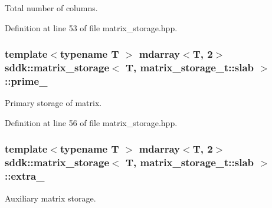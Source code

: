 Total number of columns. 



Definition at line 53 of file matrix\+\_\+storage.\+hpp.

\hypertarget{classsddk_1_1matrix__storage_3_01_t_00_01matrix__storage__t_1_1slab_01_4_a36fd50a540cca9842230ae29ba05b8bc}{}
\subsubsection[{prime\+\_\+}]{\setlength{\rightskip}{0pt plus 5cm}template$<$typename T $>$ {\bf mdarray}$<$T, 2$>$ {\bf sddk\+::matrix\+\_\+storage}$<$ T, matrix\+\_\+storage\+\_\+t\+::slab $>$\+::prime\+\_\+\hspace{0.3cm}{\ttfamily [private]}}\label{classsddk_1_1matrix__storage_3_01_t_00_01matrix__storage__t_1_1slab_01_4_a36fd50a540cca9842230ae29ba05b8bc}


Primary storage of matrix. 



Definition at line 56 of file matrix\+\_\+storage.\+hpp.

\hypertarget{classsddk_1_1matrix__storage_3_01_t_00_01matrix__storage__t_1_1slab_01_4_abf951b4fd1c7be54bbb5e01876db40b5}{}
\subsubsection[{extra\+\_\+}]{\setlength{\rightskip}{0pt plus 5cm}template$<$typename T $>$ {\bf mdarray}$<$T, 2$>$ {\bf sddk\+::matrix\+\_\+storage}$<$ T, matrix\+\_\+storage\+\_\+t\+::slab $>$\+::extra\+\_\+\hspace{0.3cm}{\ttfamily [private]}}\label{classsddk_1_1matrix__storage_3_01_t_00_01matrix__storage__t_1_1slab_01_4_abf951b4fd1c7be54bbb5e01876db40b5}


Auxiliary matrix storage. 

